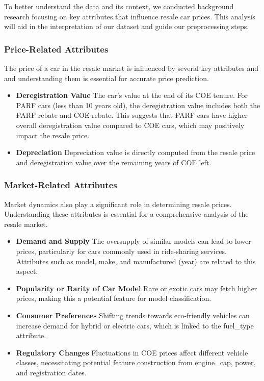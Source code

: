 \documentclass[conference]{IEEEtran}
\begin{document}
To better understand the data and its context, we conducted background research focusing on key attributes that influence resale car prices. This analysis will aid in the interpretation of our dataset and guide our preprocessing steps.

\subsubsection{Price-Related Attributes}
The price of a car in the resale market is influenced by several key attributes and and understanding them is essential for accurate price prediction. 
\begin{itemize}
    \item \textbf{Deregistration Value} The car's value at the end of its COE tenure. 
    For PARF cars (less than 10 years old), the deregistration value includes both the PARF rebate and COE rebate. 
    This suggests that PARF cars have higher overall deregistration value compared to COE cars, which may positively impact the resale price. 
    \item \textbf{Depreciation} Depreciation value is directly computed from the resale price and deregistration value over the remaining years of COE left.
\end{itemize}
\subsubsection{Market-Related Attributes}
Market dynamics also play a significant role in determining resale prices. Understanding these attributes is essential for a comprehensive analysis of the resale market.

\begin{itemize}
    \item \textbf{Demand and Supply} The oversupply of similar models can lead to lower prices, particularly for cars commonly used in ride-sharing services. Attributes such as model, make, and manufactured (year) are related to this aspect.
    \item \textbf{Popularity or Rarity of Car Model} Rare or exotic cars may fetch higher prices, making this a potential feature for model classification.
    \item \textbf{Consumer Preferences} Shifting trends towards eco-friendly vehicles can increase demand for hybrid or electric cars, which is linked to the fuel\_type attribute.
    \item \textbf{Regulatory Changes} Fluctuations in COE prices affect different vehicle classes, necessitating potential feature construction from engine\_cap, power, and registration dates.
\end{itemize}
\end{document}
